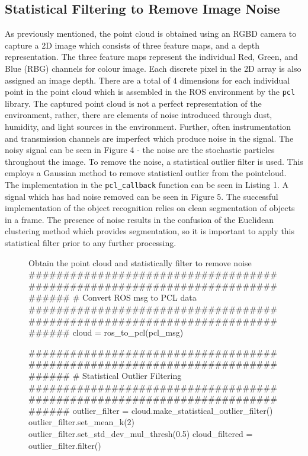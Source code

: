 \documentclass[a4paper]{article}
\begin{document}
\subsection{Statistical Filtering to Remove Image Noise}
As previously mentioned, the point cloud is obtained using an RGBD camera to capture a 2D image which consists of three feature maps, and a depth representation. The three feature maps represent the individual Red, Green, and Blue (RBG) channels for colour image. Each discrete pixel in the 2D array is also assigned an image depth. There are a total of 4 dimensions for each individual point in the point cloud which is assembled in the ROS environment by the \verb|pcl| library. The captured point cloud is not a perfect representation of the environment, rather, there are elements of noise introduced through dust, humidity, and light sources in the environment. Further, often instrumentation and transmission channels are imperfect which produce noise in the signal. The noisy signal can be seen in Figure 4 - the noise are the stochastic particles throughout the image. To remove the noise, a statistical outlier filter is used. This employs a Gaussian method to remove statistical outlier from the pointcloud. The implementation in the \verb|pcl_callback| function can be seen in Listing 1. A signal which has had noise removed can be seen in Figure 5. The successful implementation of the object recognition relies on clean segmentation of objects in a frame. The presence of noise results in the confusion of the Euclidean clustering method which provides segmentation, so it is important to apply this statistical filter prior to any further processing.

\vspace{1cm}

\begin{figure}[h]\scriptsize
\begin{sexylisting}{Obtain the point cloud and statistically filter to remove noise}
##############################################################################
    # Convert ROS msg to PCL data
##############################################################################
    cloud = ros_to_pcl(pcl_msg)

##############################################################################
    # Statistical Outlier Filtering
##############################################################################
    outlier_filter = cloud.make_statistical_outlier_filter()
    outlier_filter.set_mean_k(2)
    outlier_filter.set_std_dev_mul_thresh(0.5)
    cloud_filtered = outlier_filter.filter()
\end{sexylisting}
\end{figure}
\end{document}
